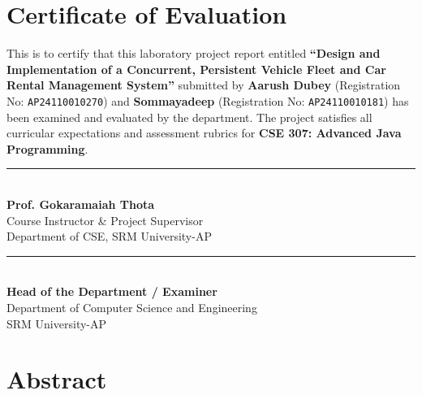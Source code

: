 \documentclass[11pt,a4paper]{article}
\begin{document}
\vspace{2.2cm}

\section*{Certificate of Evaluation}

This is to certify that this laboratory project report entitled \textbf{``Design and Implementation of a Concurrent, Persistent Vehicle Fleet and Car Rental Management System''} submitted by \textbf{Aarush Dubey} (Registration No: \texttt{AP24110010270}) and \textbf{Sommayadeep} (Registration No: \texttt{AP24110010181}) has been examined and evaluated by the department. The project satisfies all curricular expectations and assessment rubrics for \textbf{CSE 307: Advanced Java Programming}.

\vspace{2.0cm}

\noindent
\begin{minipage}{0.48\textwidth}
    \begin{flushleft}
        \rule{6.5cm}{0.4pt}\\
        \textbf{Prof. Gokaramaiah Thota}\\
        Course Instructor \& Project Supervisor\\
        Department of CSE, SRM University-AP
    \end{flushleft}
\end{minipage}
\hfill
\begin{minipage}{0.48\textwidth}
    \begin{flushright}
        \rule{6.5cm}{0.4pt}\\
        \textbf{Head of the Department / Examiner}\\
        Department of Computer Science and Engineering\\
        SRM University-AP
    \end{flushright}
\end{minipage}

\newpage
\thispagestyle{plain}
\section*{Abstract}
\end{document}
